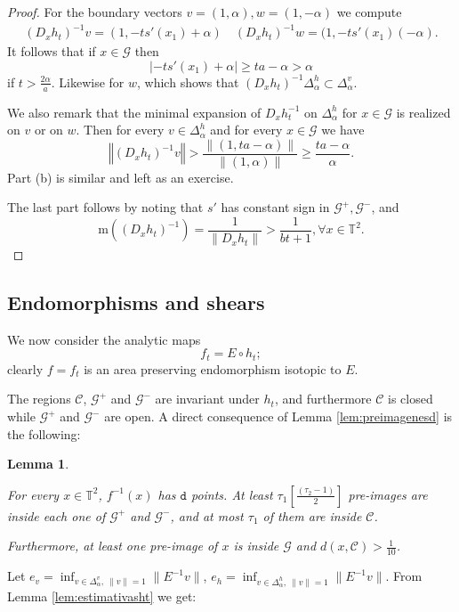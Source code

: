 \documentclass[11pt,letterpaper,reqno]{article}
\newtheorem{lemma}{Lemma}[section]
\newcommand{\norm}[1]{\left\Vert#1\right\Vert}
\newcommand{\conorm}[1]{\mathrm{m}\left(#1\right)}
\newcommand{\Tor}{\mathbb{T}^2}
\newcommand{\Deh}{\Delta_{\alpha}^h}
\newcommand{\Dev}{\Delta_{\alpha}^v}
\begin{document}
\begin{proof}
	For the boundary vectors $v=(1,\alpha), w=(1,-\alpha)$ we compute
	\begin{align*}
		(D_xh_t)^{-1}v=(1,-ts'(x_1) +\alpha)\quad  (D_xh_t)^{-1}w=(1,-ts'(x_1)( -\alpha).
	\end{align*}
	It follows that if $x\in\mathcal{G}$ then
	\[
	|-ts'(x_1) +\alpha|\geq ta-\alpha>\alpha
	\]
	if $t>\frac{2\alpha}a$. Likewise for $w$, which shows that $(D_xh_t)^{-1}\Deh\subset \Dev$.
	
	We also remark that the minimal expansion of $D_xh_t^{-1}$ on $\Deh$ for $x\in\mathcal G$ is realized on $v$ or on $w$. Then for every $v\in \Deh$ and for every $x\in \mathcal{G}$ we have
	\[
	\norm{(D_xh_t)^{-1}v}> \frac{\|(1,ta-\alpha)\|}{\|(1,\alpha)\|}\geq\frac{ta-\alpha}{\alpha}.
	\]   
	Part (b) is similar and left as an exercise.
	
	The last part follows by noting that $s'$ has constant sign in $\mathcal{G}^+, \mathcal{G}^-$, and
	\[
	\conorm{(D_xh_t)^{-1}}=\frac 1{\|D_xh_t\|}> \frac{1}{bt+1}, \forall x\in \Tor.
	\]  
\end{proof}

\subsection{Endomorphisms and shears} %
\label{sub:endomorphismsandshears}

We now consider the analytic maps
\[
f_t=E\circ h_t;	
\]
clearly $f=f_t$ is an area preserving endomorphism isotopic to $E$.

The regions $\mathcal C$, $\mathcal G^+$ and $\mathcal G^-$ are invariant under $h_t$, and furthermore $\mathcal C$ is closed while $\mathcal G^+$ and $\mathcal G^-$ are open. A direct consequence of Lemma \ref{lem:preimagenesd} is the following:


\begin{lemma}\label{lem:preimagenesdd}

For every $x\in\Tor$, $f^{-1}(x)$ has $\mathtt{d}$ points. At least $\tau_1[\frac{(\tau_2-1)}2]$ pre-images are inside each one of $\mathcal G^+$ and $\mathcal G^-$, and at most $\tau_1$ of them are inside $\mathcal C$.

Furthermore, at least one pre-image of $x$ is inside $\mathcal G$ and $d(x,\mathcal C)>\frac 1{10}$.
\end{lemma}



Let $e_v=\inf_{v\in\Dev,\ \|v\|=1}\|E^{-1}v\|$, $e_h=\inf_{v\in\Deh,\ \|v\|=1}\|E^{-1}v\|$. From Lemma \ref{lem:estimativasht} we get:
\end{document}
